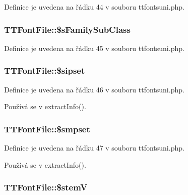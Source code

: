 Definice je uvedena na řádku 44 v souboru ttfontsuni.\-php.

\hypertarget{class_t_t_font_file_a486325e6c83c85497008d6d18632c197}{
\subsubsection[{\$s\-Family\-Sub\-Class}]{\setlength{\rightskip}{0pt plus 5cm}T\-T\-Font\-File\-::\$s\-Family\-Sub\-Class}}\label{class_t_t_font_file_a486325e6c83c85497008d6d18632c197}


Definice je uvedena na řádku 45 v souboru ttfontsuni.\-php.

\hypertarget{class_t_t_font_file_a81e1a350ee3ea588225ba0826d540b83}{
\subsubsection[{\$sipset}]{\setlength{\rightskip}{0pt plus 5cm}T\-T\-Font\-File\-::\$sipset}}\label{class_t_t_font_file_a81e1a350ee3ea588225ba0826d540b83}


Definice je uvedena na řádku 46 v souboru ttfontsuni.\-php.



Používá se v extract\-Info().

\hypertarget{class_t_t_font_file_a04cde3d9fa2287dd20434685d7a5c5b4}{
\subsubsection[{\$smpset}]{\setlength{\rightskip}{0pt plus 5cm}T\-T\-Font\-File\-::\$smpset}}\label{class_t_t_font_file_a04cde3d9fa2287dd20434685d7a5c5b4}


Definice je uvedena na řádku 47 v souboru ttfontsuni.\-php.



Používá se v extract\-Info().

\hypertarget{class_t_t_font_file_a60b6f66707aea0966e41eab3848b4de4}{
\subsubsection[{\$stem\-V}]{\setlength{\rightskip}{0pt plus 5cm}T\-T\-Font\-File\-::\$stem\-V}}\label{class_t_t_font_file_a60b6f66707aea0966e41eab3848b4de4}


